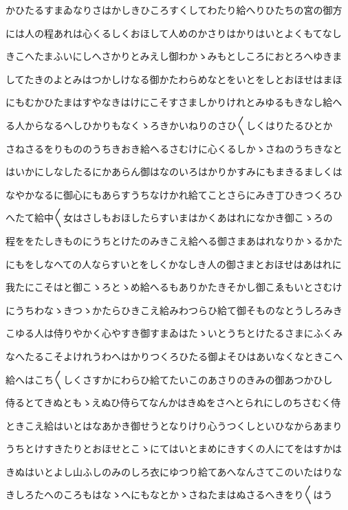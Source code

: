 \documentclass[a4paper,11pt,landscape]{ltjtarticle}
\begin{document}
かひたるすまゐなりさはかしきひころすくしてわたり給へりひたちの宮の御方
\par\medskip
には人の程あれは心くるしくおほして人めのかさりはかりはいとよくもてなし
\par\medskip
きこへたまふいにしへさかりとみえし御わかゝみもとしころにおとろへゆきま
\par\medskip
してたきのよとみはつかしけなる御かたわらめなとをいとをしとおほせはまほ
\par\medskip
にもむかひたまはすやなきはけにこそすさましかりけれとみゆるもきなし給へ
\par\medskip
る人からなるへしひかりもなくゝろきかいねりのさひ〱しくはりたるひとか
\par\medskip
さねさるをりもののうちきおき給へるさむけに心くるしかゝさねのうちきなと
\par\medskip
はいかにしなしたるにかあらん御はなのいろはかりかすみにもまきるましくは
\par\medskip
なやかなるに御心にもあらすうちなけかれ給てことさらにみき丁ひきつくろひ
\par\medskip
へたて給中〱女はさしもおほしたらすいまはかくあはれになかき御こゝろの
\par\medskip
程ををたしきものにうちとけたのみきこえ給へる御さまあはれなりかゝるかた
\par\medskip
にもをしなへての人ならすいとをしくかなしき人の御さまとおほせはあはれに
\par\medskip
我たにこそはと御こゝろとゝめ給へるもありかたきそかし御こゑもいとさむけ
\par\medskip
にうちわなゝきつゝかたらひきこえ給みわつらひ給て御そものなとうしろみき
\par\medskip
こゆる人は侍りやかく心やすき御すまゐはたゝいとうちとけたるさまにふくみ
\par\medskip
なへたるこそよけれうわへはかりつくろひたる御よそひはあいなくなときこへ
\par\medskip
給へはこち〱しくさすかにわらひ給てたいこのあさりのきみの御あつかひし
\par\medskip
侍るとてきぬともゝえぬひ侍らてなんかはきぬをさへとられにしのちさむく侍
\par\medskip
ときこえ給はいとはなあかき御せうとなりけり心うつくしといひなからあまり
\par\medskip
うちとけすきたりとおほせとこゝにてはいとまめにきすくの人にてをはすかは
\par\medskip
きぬはいとよし山ふしのみのしろ衣にゆつり給てあへなんさてこのいたはりな
\par\medskip
きしろたへのころもはなゝへにもなとかゝさねたまはぬさるへきをり〱はう
\end{document}
